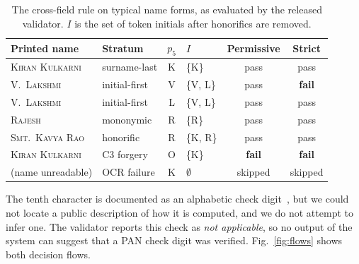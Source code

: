 \documentclass[conference]{IEEEtran}
\begin{document}
\begin{table}[!t]
\caption{The cross-field rule on typical name forms, as evaluated by
the released validator. $I$ is the set of token initials after
honorifics are removed.}
\label{tab:semexamples}
\centering
\scriptsize
\setlength{\tabcolsep}{3pt}
\renewcommand{\arraystretch}{1.12}
\begin{tabular}{@{}l l c l c c@{}}
\toprule
Printed name & Stratum & $p_5$ & $I$ & Permissive & Strict \\
\midrule
\textsc{Kiran Kulkarni}  & surname-last  & K & \{K\}    & pass & pass \\
\textsc{V.\ Lakshmi}     & initial-first & V & \{V, L\} & pass & \textbf{fail} \\
\textsc{V.\ Lakshmi}     & initial-first & L & \{V, L\} & pass & pass \\
\textsc{Rajesh}          & mononymic     & R & \{R\}    & pass & pass \\
\textsc{Smt.\ Kavya Rao} & honorific     & R & \{K, R\} & pass & pass \\
\textsc{Kiran Kulkarni}  & C3 forgery    & O & \{K\}    & \textbf{fail} & \textbf{fail} \\
(name unreadable)        & OCR failure   & K & $\emptyset$ & skipped & skipped \\
\bottomrule
\end{tabular}
\end{table}

The tenth character is documented as an alphabetic check
digit~\cite{itd-pan}, but we could not locate a public description of
how it is computed, and we do not attempt to infer one. The validator
reports this check as \emph{not applicable}, so no output of the system
can suggest that a PAN check digit was verified. Fig.~\ref{fig:flows}
shows both decision flows.
\end{document}
